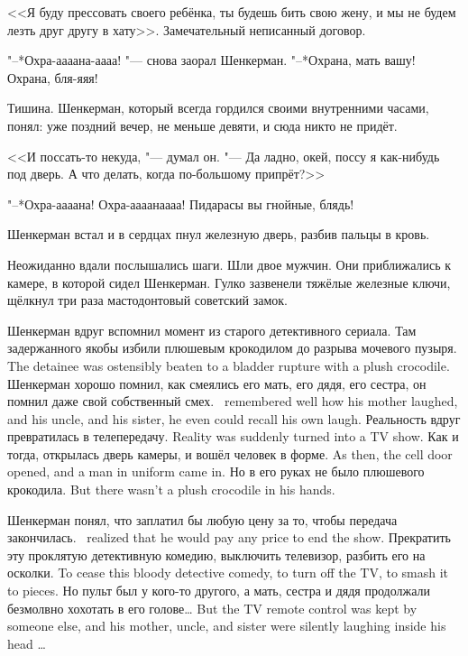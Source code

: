 <<Я буду прессовать своего ребёнка, ты будешь бить свою жену, и мы не будем лезть друг другу в хату>>.
Замечательный неписанный договор.

"--*Охра-аааана-аааа! "--- снова заорал Шенкерман.
"--*Охрана, мать вашу!
Охрана, бля-яяя!

Тишина.
Шенкерман, который всегда гордился своими внутренними часами, понял: уже поздний вечер, не меньше девяти, и сюда никто не придёт.

<<И поссать-то некуда, "--- думал он.
"--- Да ладно, окей, поссу я как-нибудь под дверь.
А что делать, когда по-большому припрёт?>>

"--*Охра-аааана!
Охра-аааанаааа!
Пидарасы вы гнойные, блядь!

Шенкерман встал и в сердцах пнул железную дверь, разбив пальцы в кровь.

Неожиданно вдали послышались шаги.
Шли двое мужчин.
Они приближались к камере, в которой сидел Шенкерман.
Гулко зазвенели тяжёлые железные ключи, щёлкнул три раза мастодонтовый советский замок.

Шенкерман вдруг вспомнил момент из старого детективного сериала.
{Там задержанного якобы избили плюшевым крокодилом до разрыва мочевого пузыря.}
{The detainee was ostensibly beaten to a bladder rupture with a plush crocodile.}
{Шенкерман хорошо помнил, как смеялись его мать, его дядя, его сестра, он помнил даже свой собственный смех.}
{\Shenkerman\ remembered well how his mother laughed, and his uncle, and his sister, he even could recall his own laugh.}
{Реальность вдруг превратилась в телепередачу.}
{Reality was suddenly turned into a TV show.}
{Как и тогда, открылась дверь камеры, и вошёл человек в форме.}
{As then, the cell door opened, and a man in uniform came in.}
{Но в его руках не было плюшевого крокодила.}
{But there wasn't a plush crocodile in his hands.}

{Шенкерман понял, что заплатил бы любую цену за то, чтобы передача закончилась.}
{\Shenkerman\ realized that he would pay any price to end the show.}
{Прекратить эту проклятую детективную комедию, выключить телевизор, разбить его на осколки.}
{To cease this bloody detective comedy, to turn off the TV, to smash it to pieces.}
{Но пульт был у кого-то другого, а мать, сестра и дядя продолжали безмолвно хохотать в его голове\ldots{}}
{But the TV remote control was kept by someone else, and his mother, uncle, and sister were silently laughing inside his head \ldots{}}

